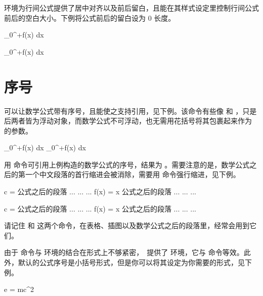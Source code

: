  环境为行间公式提供了居中对齐以及前后留白，且能在其样式设定里控制行间公式前后的空白大小。下例将公式前后的留白设为 0 长度。

\starttyping[option=TEX]
\setupformulas[spacebefore=0pt,spaceafter=0pt]
\startformula
\int_0^{+\infty}f(x) {\rm d}x
\stopformula
\stoptyping

\begingroup
\setupformula[spacebefore=0pt,spaceafter=0pt]
\startformula
\int_0^{+\infty}f(x) {\rm d}x
\stopformula
\endgroup

\section[placeformula]{序号}

 可以让数学公式带有序号，且能使之支持引用，见下例。该命令有些像  和 ，只是后两者皆为浮动对象，而数学公式不可浮动，也无需用花括号将其包裹起来作为  的参数。

\startTEX
{}
\startformula
\int_0^{+\infty}f(x) {\rm d}x
\stopformula
\stopTEX
{}
\startformula
\int_0^{+\infty}f(x) {\rm d}x
\stopformula

\indentation 用  命令可引用上例构造的数学公式的序号，结果为 。需要注意的是，数学公式之后的第一个中文段落的首行缩进会被消除，需要用  命令强行缩进，见下例。

\startTEX
\placeformula
\startformula c = \pm{} \stopformula
公式之后的段落 ... ... ...
\placeformula
\startformula f(x) = \sin x \stopformula
\indentation 公式之后的段落 ... ... ...
\stopTEX

\startframedtext[width=\textwidth]
\placeformula\startformula c = \pm{} \stopformula
公式之后的段落 ... ... ...
\placeformula\startformula f(x) = \sin x \stopformula
\indentation 公式之后的段落 ... ... ...
\stopframedtext

请记住  和  这两个命令，在表格、插图以及数学公式之后的段落里，经常会用到它们。

由于  命令与  环境的结合在形式上不够紧密，\CONTEXT\ 提供了  环境，它与  命令等效。此外，默认的公式序号是小括号形式，但是你可以将其设定为你需要的形式，见下例。

\startTEX
\setupformula[left={[}, right={]}]
\startplaceformula[在此放置引用]
\startformula
e = mc^2
\stopformula
\stopplaceformula
\stopTEX

